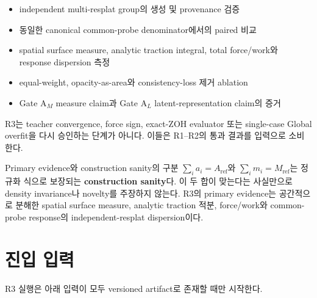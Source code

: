 \documentclass[10pt,a4paper]{article}
\begin{document}
\begin{itemize}
  \item independent multi-resplat group의 생성 및 provenance 검증
  \item 동일한 canonical common-probe denominator에서의 paired 비교
  \item spatial surface measure, analytic traction integral, total force/work와 response dispersion 측정
  \item equal-weight, opacity-as-area와 consistency-loss 제거 ablation
  \item Gate A\(_M\) measure claim과 Gate A\(_L\) latent-representation claim의 증거
\end{itemize}

R3는 teacher convergence, force sign, exact-ZOH evaluator 또는 single-case Global overfit을
다시 승인하는 단계가 아니다. 이들은 R1--R2의 통과 결과를 입력으로 소비한다.

\begin{contractbox}{Primary evidence와 construction sanity의 구분}
\(\sum_i a_i=A_{\mathrm{ref}}\)와 \(\sum_i m_i=M_{\mathrm{ref}}\)는
정규화 식으로 보장되는 \textbf{construction sanity}다. 이 두 합이 맞는다는 사실만으로
density invariance나 novelty를 주장하지 않는다. R3의 primary evidence는 공간적으로 분해한
spatial surface measure, analytic traction 적분, force/work와 common-probe response의 independent-resplat
dispersion이다.
\end{contractbox}

\section{진입 입력}
\label{sec:r3-chapter-2}

R3 실행은 아래 입력이 모두 versioned artifact로 존재할 때만 시작한다.
\end{document}
